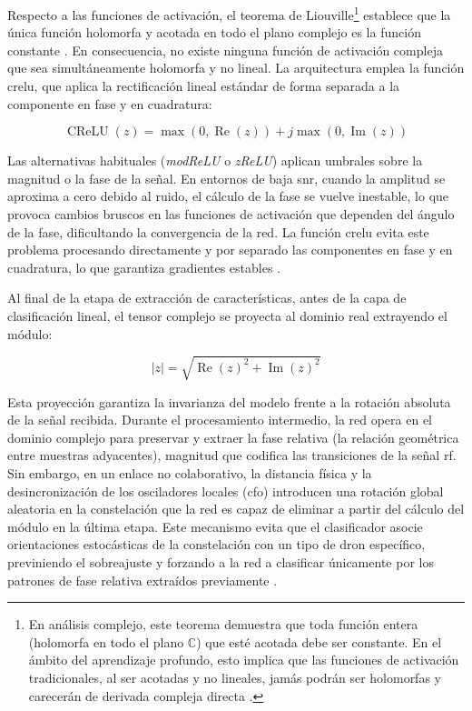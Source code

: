 Respecto a las funciones de activación, el teorema de Liouville\footnote{En análisis complejo, este teorema demuestra que toda función entera (holomorfa en todo el plano $\mathbb{C}$) que esté acotada debe ser constante. En el ámbito del aprendizaje profundo, esto implica que las funciones de activación tradicionales, al ser acotadas y no lineales, jamás podrán ser holomorfas y carecerán de derivada compleja directa \cite{hirose_complex-valued_2012}.} establece que la única función holomorfa y acotada en todo el plano complejo es la función constante \cite{trabelsi_deep_2018}. En consecuencia, no existe ninguna función de activación compleja que sea simultáneamente holomorfa y no lineal. La arquitectura emplea la función \gls{crelu}, que aplica la rectificación lineal estándar de forma separada a la componente en fase y en cuadratura:

\begin{equation}
    \operatorname{CReLU}(z) = \max(0,\operatorname{Re}(z)) + j\max(0,\operatorname{Im}(z))
    \label{eq:crelu}
\end{equation}

Las alternativas habituales (\textit{modReLU} o \textit{zReLU}) aplican umbrales sobre la magnitud o la fase de la señal. En entornos de baja \gls{snr}, cuando la amplitud se aproxima a cero debido al ruido, el cálculo de la fase se vuelve inestable, lo que provoca cambios bruscos en las funciones de activación que dependen del ángulo de la fase, dificultando la convergencia de la red. La función \gls{crelu} evita este problema procesando directamente y por separado las componentes en fase y en cuadratura, lo que garantiza gradientes estables \cite{trabelsi_deep_2018, bassey_survey_2021}.

Al final de la etapa de extracción de características, antes de la capa de clasificación lineal, el tensor complejo se proyecta al dominio real extrayendo el módulo:

\begin{equation*}
    |z| = \sqrt{\operatorname{Re}(z)^2 + \operatorname{Im}(z)^2}
\end{equation*}

Esta proyección garantiza la invarianza del modelo frente a la rotación absoluta de la señal recibida. Durante el procesamiento intermedio, la red opera en el dominio complejo para preservar y extraer la fase relativa (la relación geométrica entre muestras adyacentes), magnitud que codifica las transiciones de la señal \gls{rf}. Sin embargo, en un enlace no colaborativo, la distancia física y la desincronización de los osciladores locales (\gls{cfo}) introducen una rotación global aleatoria en la constelación que la red es capaz de eliminar a partir del cálculo del módulo en la última etapa. Este mecanismo evita que el clasificador asocie orientaciones estocásticas de la constelación con un tipo de dron específico, previniendo el sobreajuste y forzando a la red a clasificar únicamente por los patrones de fase relativa extraídos previamente \cite{hirose_complex-valued_2012}.

